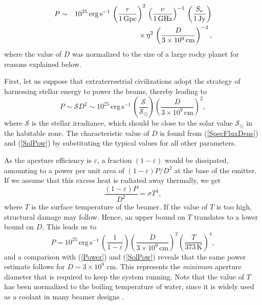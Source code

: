 \documentclass[twocolumn,tighten]{aastex61}
\begin{document}
\begin{eqnarray} \label{Power}
P &\sim& 10^{25}\,\mathrm{erg\,s^{-1}}\, \left(\frac{r}{1\,\mathrm{Gpc}}\right)^{2}\, \left(\frac{\nu}{1\,\mathrm{GHz}}\right)^{-1}\, \left(\frac{S_\nu}{1\,\mathrm{Jy}}\right) \nonumber \\
&& \hspace{0.33 in} \times\,\eta^2\,\left(\frac{D}{3\times 10^9\,\mathrm{cm}}\right)^{-2},
\end{eqnarray}
where the value of $D$ was normalized to the size of a large rocky planet \citep{WF15} for reasons explained below.

First, let us suppose that extraterrestrial civilizations adopt the strategy of harnessing stellar energy \citep{Lubin16} to power the beams, thereby leading to
\begin{equation} \label{SolPow}
P \sim \mathcal{S} D^2 \sim 10^{25}\,\mathrm{erg\,s^{-1}}\,\left(\frac{\mathcal{S}}{\mathcal{S}_\odot}\right) \left(\frac{D}{3\times 10^9\,\mathrm{cm}}\right)^{2},
\end{equation}
where $\mathcal{S}$ is the stellar irradiance, which should be close to the solar value $\mathcal{S}_\odot$ in the habitable zone. The characteristic value of $D$ is found from (\ref{SpecFluxDens}) and (\ref{SolPow}) by substituting the typical values for all other parameters.

As the aperture efficiency is $\varepsilon$, a fraction $\left(1-\varepsilon\right)$ would be dissipated, amounting to a power per unit area of $\left(1-\varepsilon\right)P/D^2$ at the base of the emitter. If we assume that this excess heat is radiated away thermally, we get
\begin{equation} \label{HeatBal}
\frac{\left(1-\varepsilon\right) P}{D^2} = \sigma T^4,
\end{equation}
where $T$ is the surface temperature of the beamer. If the value of $T$ is too high, structural damage may follow. Hence, an upper bound on $T$ translates to a lower bound on $D$. This leads us to
\begin{equation} \label{HeatPow}
P = 10^{25}\,\mathrm{erg\,s^{-1}}\,\left(\frac{1}{1-\varepsilon}\right)\left(\frac{D}{3\times 10^9\,\mathrm{cm}}\right)^{2} \left(\frac{T}{373\,\mathrm{K}}\right)^4,
\end{equation}
and a comparison with (\ref{Power}) and (\ref{SolPow}) reveals that the same power estimate follows for $D \sim 3 \times 10^9$ cm. This represents the \emph{minimum} aperture diameter that is required to keep the system running. Note that the value of $T$ has been normalized to the boiling temperature of water, since it is widely used as a coolant in many beamer designs \citep{WNDRW}.
\end{document}
